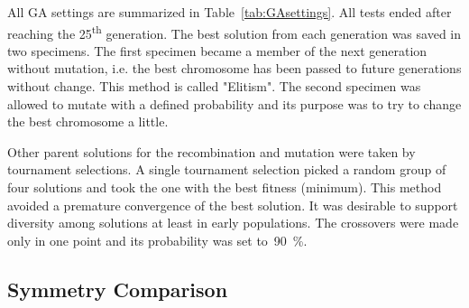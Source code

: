 All GA settings are summarized in Table~\ref{tab:GAsettings}. All tests ended after reaching the 25\textsuperscript{th} generation. The best solution from each generation was saved in two specimens. The first specimen became a member of the next generation without mutation, i.e. the best chromosome has been passed to future generations without change. This method is called "Elitism". The second specimen was allowed to mutate with a defined probability and its purpose was to try to change the best chromosome a little.

Other parent solutions for the recombination and mutation were taken by tournament selections. A single tournament selection picked a random group of four solutions and took the one with the best fitness (minimum). This method avoided a premature convergence of the best solution. It was desirable to support diversity among solutions at least in early populations. The crossovers were made only in one point and its probability was set to~90~\%.

\subsection{Symmetry Comparison}

